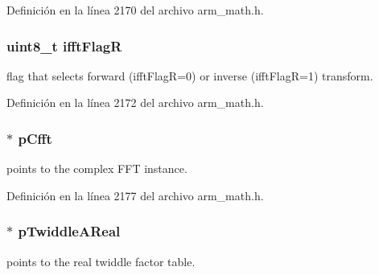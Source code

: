 Definición en la línea 2170 del archivo arm\+\_\+math.\+h.

\subsubsection[{\texorpdfstring{ifft\+FlagR}{ifftFlagR}}]{\setlength{\rightskip}{0pt plus 5cm}uint8\+\_\+t ifft\+FlagR}\hypertarget{structarm__rfft__instance__q31_a787d72055c89e4d62b188d6bd646341c}{}\label{structarm__rfft__instance__q31_a787d72055c89e4d62b188d6bd646341c}
flag that selects forward (ifft\+FlagR=0) or inverse (ifft\+FlagR=1) transform. 

Definición en la línea 2172 del archivo arm\+\_\+math.\+h.

\subsubsection[{\texorpdfstring{p\+Cfft}{pCfft}}]{$\ast$ p\+Cfft}\hypertarget{structarm__rfft__instance__q31_a0b1f4a05c1824bab3b9bd837a260232a}{}\label{structarm__rfft__instance__q31_a0b1f4a05c1824bab3b9bd837a260232a}
points to the complex F\+FT instance. 

Definición en la línea 2177 del archivo arm\+\_\+math.\+h.

\subsubsection[{\texorpdfstring{p\+Twiddle\+A\+Real}{pTwiddleAReal}}]{$\ast$ p\+Twiddle\+A\+Real}\hypertarget{structarm__rfft__instance__q31_a059faa282f9186687d843ead4a7a0d7e}{}\label{structarm__rfft__instance__q31_a059faa282f9186687d843ead4a7a0d7e}
points to the real twiddle factor table. 

